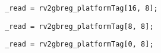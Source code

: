 \implementation{}
\begin{lstlisting}
_read = rv2gbreg_platformTag[16, 8];
\end{lstlisting}

\implementation{}
\begin{lstlisting}
_read = rv2gbreg_platformTag[8, 8];
\end{lstlisting}

\implementation{}
\begin{lstlisting}
_read = rv2gbreg_platformTag[0, 8];
\end{lstlisting}

